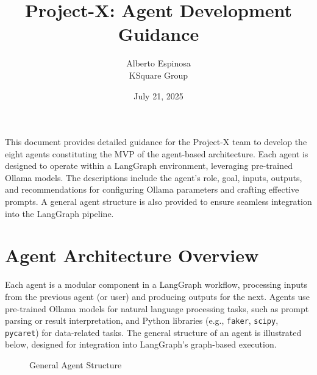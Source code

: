\documentclass{article}
\title{Project-X: Agent Development Guidance}
\author{Alberto Espinosa\\
KSquare Group}
\date{July 21, 2025}
\begin{document}
\maketitle

This document provides detailed guidance for the Project-X team to develop the eight agents constituting the MVP of the agent-based architecture. Each agent is designed to operate within a LangGraph environment, leveraging pre-trained Ollama models. The descriptions include the agent’s role, goal, inputs, outputs, and recommendations for configuring Ollama parameters and crafting effective prompts. A general agent structure is also provided to ensure seamless integration into the LangGraph pipeline.

\section{Agent Architecture Overview}

Each agent is a modular component in a LangGraph workflow, processing inputs from the previous agent (or user) and producing outputs for the next. Agents use pre-trained Ollama models for natural language processing tasks, such as prompt parsing or result interpretation, and Python libraries (e.g., \texttt{faker}, \texttt{scipy}, \texttt{pycaret}) for data-related tasks. The general structure of an agent is illustrated below, designed for integration into LangGraph’s graph-based execution.

\begin{figure}[h]
\centering
{}
\caption{General Agent Structure}
\end{figure}
\end{document}
